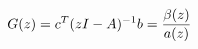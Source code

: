 \documentclass[preview]{standalone}
\begin{document}
\begin{align*}
\special{dvisvgm:raw <g id='unique000'>}G(z)=c^{T}(zI-A)^{-1}b=\frac{\beta(z)}{a(z)}\special{dvisvgm:raw </g>}
\end{align*}
\end{document}
